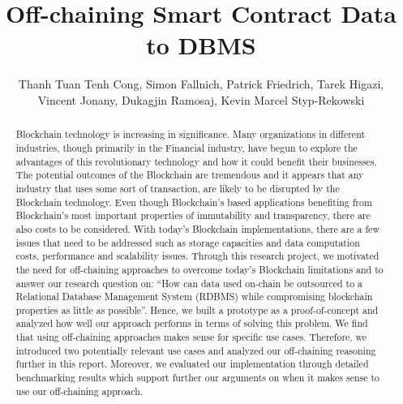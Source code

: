 \documentclass[a4paper]{article}
\title{Off-chaining Smart Contract Data to DBMS}
\author{Thanh Tuan Tenh Cong, 
Simon Fallnich,
Patrick Friedrich,
Tarek Higazi,\\
Vincent Jonany,
Dukagjin Ramosaj,
Kevin Marcel Styp-Rekowski}
\begin{document}
\maketitle

\begin{abstract}

Blockchain technology is increasing in significance. Many organizations in different industries, though primarily in the Financial industry, have begun to explore the advantages of this revolutionary technology and how it could benefit their businesses. The potential outcomes of the Blockchain are tremendous and it appears that any industry that uses some sort of transaction, are likely to be disrupted by the Blockchain technology. Even though Blockchain’s based applications benefiting from Blockchain’s most important properties of immutability and transparency, there are also costs to be considered. With today’s Blockchain implementations, there are a few issues that need to be addressed such as storage capacities and data computation costs, performance and scalability issues. Through this research project, we motivated the need for off-chaining approaches to overcome today’s Blockchain limitations and to answer our research question on: “How can data used on-chain be outsourced to a Relational Database Management System (RDBMS) while compromising blockchain properties as little as possible”. Hence, we built a prototype as a proof-of-concept and analyzed how well our approach performs in terms of solving this problem. We find that using off-chaining approaches makes sense for specific use cases. Therefore, we introduced two potentially relevant use cases and analyzed our off-chaining reasoning further in this report. Moreover, we evaluated our implementation through detailed benchmarking results which support further our arguments on when it makes sense to use our off-chaining approach.


\end{abstract}
\newpage
\tableofcontents
\newpage











\newpage


\end{document}
